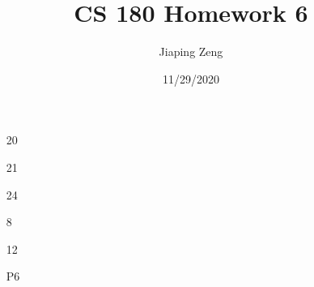 \documentclass{article}
\title{CS 180 Homework 6}
\date{11/29/2020}
\author{Jiaping Zeng}
\begin{document}
\maketitle

\begin{itemize}
    \item [20]
    \item [21]
    \item [24]
    \item [8]
    \item [12]
    \item [P6]
\end{itemize}
\end{document}
